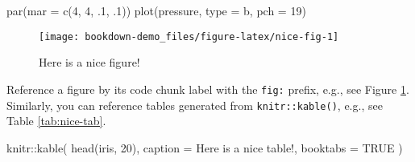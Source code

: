 \documentclass[
]{book}
\newenvironment{Shaded}{\begin{snugshade}}{\end{snugshade}}
\newcommand{\AttributeTok}[1]{\textcolor[rgb]{0.77,0.63,0.00}{#1}}
\newcommand{\ConstantTok}[1]{\textcolor[rgb]{0.00,0.00,0.00}{#1}}
\newcommand{\DecValTok}[1]{\textcolor[rgb]{0.00,0.00,0.81}{#1}}
\newcommand{\FunctionTok}[1]{\textcolor[rgb]{0.00,0.00,0.00}{#1}}
\newcommand{\NormalTok}[1]{#1}
\newcommand{\SpecialCharTok}[1]{\textcolor[rgb]{0.00,0.00,0.00}{#1}}
\newcommand{\StringTok}[1]{\textcolor[rgb]{0.31,0.60,0.02}{#1}}
\begin{document}
\begin{Shaded}
\begin{Highlighting}[]
\FunctionTok{par}\NormalTok{(}\AttributeTok{mar =} \FunctionTok{c}\NormalTok{(}\DecValTok{4}\NormalTok{, }\DecValTok{4}\NormalTok{, .}\DecValTok{1}\NormalTok{, .}\DecValTok{1}\NormalTok{))}
\FunctionTok{plot}\NormalTok{(pressure, }\AttributeTok{type =} \StringTok{\textquotesingle{}b\textquotesingle{}}\NormalTok{, }\AttributeTok{pch =} \DecValTok{19}\NormalTok{)}
\end{Highlighting}
\end{Shaded}

\begin{figure}

{\centering \texttt{[image: bookdown-demo\_files/figure-latex/nice-fig-1]} 

}

\caption{Here is a nice figure!}\label{fig:nice-fig}
\end{figure}

Reference a figure by its code chunk label with the \texttt{fig:} prefix, e.g., see Figure \ref{fig:nice-fig}. Similarly, you can reference tables generated from \texttt{knitr::kable()}, e.g., see Table \ref{tab:nice-tab}.

\begin{Shaded}
\begin{Highlighting}[]
\NormalTok{knitr}\SpecialCharTok{::}\FunctionTok{kable}\NormalTok{(}
  \FunctionTok{head}\NormalTok{(iris, }\DecValTok{20}\NormalTok{), }\AttributeTok{caption =} \StringTok{\textquotesingle{}Here is a nice table!\textquotesingle{}}\NormalTok{,}
  \AttributeTok{booktabs =} \ConstantTok{TRUE}
\NormalTok{)}
\end{Highlighting}
\end{Shaded}
\end{document}
